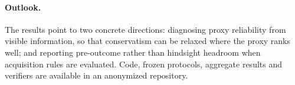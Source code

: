 \documentclass[runningheads]{llncs}
\begin{document}
\paragraph{Outlook.} The results point to two concrete directions: diagnosing proxy reliability from visible information, so that conservatism can be relaxed where the proxy ranks well; and reporting pre-outcome rather than hindsight headroom when acquisition rules are evaluated. Code, frozen protocols, aggregate results and verifiers are available in an anonymized repository.



\end{document}
